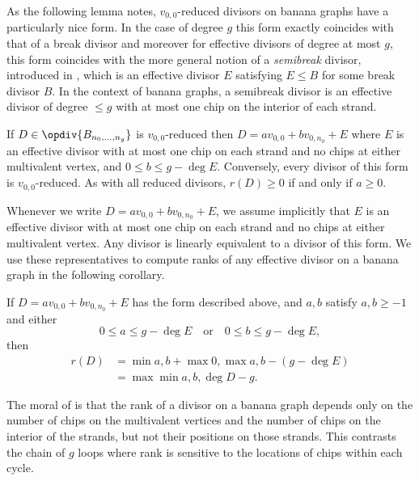 As the following lemma notes, $v_{0,0}$-reduced divisors on banana graphs have a particularly nice form. In the case of degree $g$ this form exactly coincides with that of a break divisor and moreover for effective divisors of degree at most $g$, this form coincides with the more general notion of a \textit{semibreak} divisor, introduced in \cite{GSTSemibreak}, which is an effective divisor $E$ satisfying $E\leq B$ for some break divisor $B$. In the context of banana graphs, a semibreak divisor is an effective divisor of degree $\leq g$ with at most one chip on the interior of each strand.

\begin{lemma}
    If $D \in \opdiv{B_{n_0,\dots,n_g}}$ is $v_{0,0}$-reduced then $D = av_{0,0} + bv_{0,n_0} + E$ where $E$ is an effective divisor with at most one chip on each strand and no chips at either multivalent vertex, and $0\leq b \leq g - \deg E$. Conversely, every divisor of this form is $v_{0,0}$-reduced. As with all reduced divisors, $r(D)\geq 0$ if and only if $a\geq 0$.
\end{lemma}

 Whenever we write $D = av_{0,0} + bv_{0,n_0} + E$, we assume implicitly that $E$ is an effective divisor with at most one chip on each strand and no chips at either multivalent vertex. Any divisor is linearly equivalent to a divisor of this form.
 We use these representatives to compute ranks of any effective divisor on a banana graph in the following corollary.

\begin{coro}\label{cor-BanaRankComp}
    If $D = av_{0,0} + bv_{0,n_0} + E$ has the form described above, and $a,b$ satisfy $a,b \geq -1$ and either
    \[ 0 \leq a \leq g - \deg E \quad\mbox{or} \quad 0 \leq b \leq g - \deg E,\]
    then
    \begin{align*}
        r(D) &= \min{a,b} + \max{0,\max{a,b}-(g-\deg E)}\\
            &= \max{ \min{a,b}, \deg D - g }.
    \end{align*}
\end{coro}

The moral of  is that the rank of a divisor on a banana graph depends only on the number of chips on the multivalent vertices and the number of chips on the interior of the strands, but not their positions on those strands. This contrasts the chain of $g$ loops where rank is sensitive to the locations of chips within each cycle.

